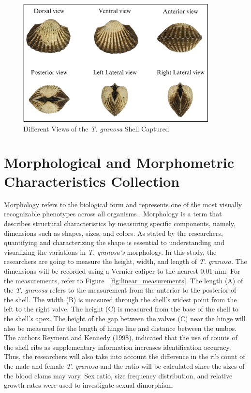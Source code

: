 \begin{figure}[!htbp]
	\centering
	\includegraphics[width=0.9\textwidth]{figures/view.png}
	\caption{Different Views of the \textit{T. granosa} Shell Captured}
	\label{fig:granosa_views}
\end{figure}

\section{Morphological and Morphometric Characteristics Collection}
\label{sec:morphochar}

Morphology refers to the biological form and represents one of the most visually recognizable phenotypes across all organisms \cite{tsutsumi2023}. Morphology is a term that describes structural characteristics by measuring specific components, namely, dimensions such as shapes, sizes, and colors. As stated by the researchers, quantifying and characterizing the shape is essential to understanding and visualizing the variations in \textit{T. granosa’s} morphology. 
In this study, the researchers are going to measure the height, width, and length of \textit{T. granosa.} The dimensions will be recorded using a Vernier caliper to the nearest 0.01 mm. For the measurements, refer to Figure ~\ref{fig:linear_measurements}. The length (A) of the \textit{T. granosa} refers to the measurement from the anterior to the posterior of the shell. The width (B) is measured through the shell’s widest point from the left to the right valve. The height (C) is measured from the base of the shell to the shell’s apex. The height of the gap between the valves (C) near the hinge will also be measured for the length of hinge line and distance between the umbos. The authors Reyment and Kennedy (1998), indicated that the use of counts of the shell ribs as supplementary information increases identification accuracy. Thus, the researchers will also take into account the difference in the rib count of the male and female \textit{T. granosa} and the ratio will be calculated since the sizes of the blood clams may vary. Sex ratio, size frequency distribution, and relative growth rates were used to investigate sexual dimorphism.

